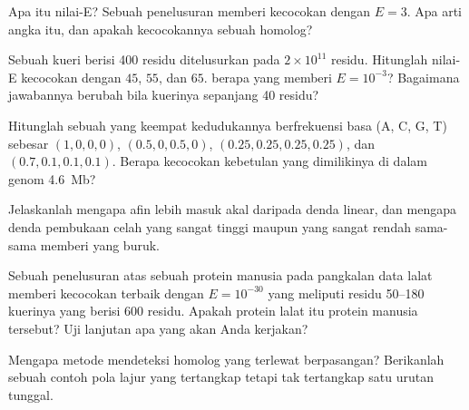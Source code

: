 \begin{exercise}[$\star$]\label{exo:b3:bioinformatics:4}
Apa itu nilai-E? Sebuah penelusuran memberi kecocokan dengan $E = 3$. Apa arti
angka itu, dan apakah kecocokannya sebuah homolog?
\end{exercise}

\begin{exercise}[$\star\star$]\label{exo:b3:bioinformatics:5}
Sebuah kueri berisi \num{400} residu ditelusurkan pada $2\times 10^{11}$
residu. Hitunglah nilai-E kecocokan dengan  $45$, $55$, dan
$65$.  berapa yang memberi $E = 10^{-3}$? Bagaimana jawabannya berubah
bila kuerinya sepanjang \num{40} residu?
\end{exercise}

\begin{exercise}[$\star\star$]\label{exo:b3:bioinformatics:6}
Hitunglah  sebuah  yang keempat kedudukannya
berfrekuensi basa (A, C, G, T) sebesar $(1,0,0,0)$, $(0.5,0,0.5,0)$,
$(0.25,0.25,0.25,0.25)$, dan $(0.7,0.1,0.1,0.1)$. Berapa kecocokan kebetulan
yang dimilikinya di dalam genom \qty{4.6}{Mb}?
\end{exercise}

\begin{exercise}[$\star\star$]\label{exo:b3:bioinformatics:7}
Jelaskanlah mengapa  afin lebih masuk akal daripada denda linear,
dan mengapa denda pembukaan celah yang sangat tinggi maupun yang sangat rendah
sama-sama memberi  yang buruk.
\end{exercise}

\begin{exercise}[$\star\star$]\label{exo:b3:bioinformatics:8}
Sebuah penelusuran  atas sebuah protein manusia pada pangkalan data lalat
memberi kecocokan terbaik dengan $E = 10^{-30}$ yang meliputi residu 50--180
kuerinya yang berisi \num{600} residu. Apakah protein lalat itu  protein
manusia tersebut? Uji lanjutan apa yang akan Anda kerjakan?
\end{exercise}

\begin{exercise}[$\star\star$]\label{exo:b3:bioinformatics:9}
Mengapa metode  mendeteksi homolog yang terlewat 
berpasangan? Berikanlah sebuah contoh pola lajur yang tertangkap 
tetapi tak tertangkap satu urutan tunggal.
\end{exercise}

